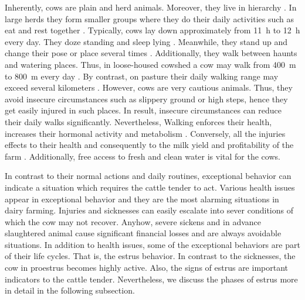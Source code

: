 \documentclass[english,12pt,a4paper,pdftex,elec,utf8]{aaltothesis}
\begin{document}
Inherently, cows are plain and herd animals. Moreover, they live in hierarchy \cite{julkaisuja52}. In large herds they form smaller groups where they do their daily activities such as eat and rest together \cite{julkaisuja52} \cite{lehmahavaintoja}. Typically, cows lay down approximately from \SI{11}{\hour} to \SI{12}{\hour} every day. They doze standing and sleep lying \cite{julkaisuja52}. Meanwhile, they stand up and change their pose or place several times \cite{luomunaudanruokinta}. Additionally, they walk between haunts and watering places. Thus, in loose-housed cowshed a cow may walk from  \SI{400}{\metre} to \SI{800}{\metre} every day \cite{luomuopas}. By contrast, on pasture their daily walking range may exceed several kilometers \cite{luomuopas} \cite{julkaisuja52}. However, cows are very cautious animals. Thus, they avoid insecure circumstances such as slippery ground or high steps, hence they get easily injured in such places. In result, insecure circumstances can reduce their daily walks significantly. Nevertheless, Walking enforces their health, increases their hormonal activity and metabolism \cite{luomuopas}. Conversely, all the injuries effects to their health and consequently to the milk yield and profitability  of the farm \cite{lehmahavaintoja}. Additionally,  free access to fresh and clean water is vital for the cows. \cite{luomuopas} 

In contrast to their normal actions and daily routines, exceptional behavior can indicate a situation which requires the cattle tender to act. Various health issues appear in exceptional behavior and they are the most alarming  situations in dairy farming. Injuries and sicknesses can easily escalate into sever conditions of which the cow may not recover. Anyhow, severe sickens and in advance slaughtered animal cause significant financial losses and are always avoidable situations. In addition to health issues, some of the exceptional behaviors are part of their life cycles. That is, the estrus behavior. In contrast to the sicknesses, the cow in proestrus becomes highly active. Also, the signs of estrus are important indicators to the cattle tender. Nevertheless, we discuss the phases of estrus more in detail in the following subsection.


 
\end{document}

